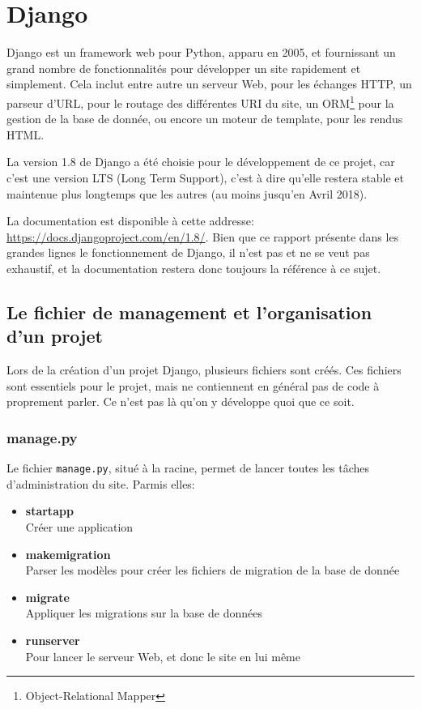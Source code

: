 \documentclass[a4paper]{report}
\begin{document}
\section{Django}
\label{sec:django}
\par Django est un framework web pour Python, apparu en 2005, et fournissant un grand nombre de fonctionnalités pour
développer un site rapidement et simplement. Cela inclut entre autre un serveur Web, pour les échanges HTTP, un parseur
d'URL, pour le routage des différentes URI du site, un ORM\footnote{Object-Relational Mapper} pour la gestion de la base
de donnée, ou encore un moteur de template, pour les rendus HTML.
\par La version 1.8 de Django a été choisie pour le développement de ce projet, car c'est une version LTS (Long Term
Support), c'est à dire qu'elle restera stable et maintenue plus longtemps que les autres (au moins jusqu'en Avril 2018).
\par La documentation est disponible à cette addresse: \url{https://docs.djangoproject.com/en/1.8/}. Bien que ce rapport
présente dans les grandes lignes le fonctionnement de Django, il n'est pas et ne se veut pas exhaustif, et la
documentation restera donc toujours la référence à ce sujet.

\subsection{Le fichier de management et l'organisation d'un projet}
\label{sub:Le fichier de management et l'organisation d'un projet}

\par Lors de la création d'un projet Django, plusieurs fichiers sont créés. Ces fichiers sont essentiels pour le projet,
mais ne contiennent en général pas de code à proprement parler. Ce n'est pas là qu'on y développe quoi que ce soit.

\subsubsection{manage.py}
\label{ssub:manage.py}

\par Le fichier \verb-manage.py-, situé à la racine, permet de lancer toutes les tâches d'administration du site. Parmis
elles:
\begin{itemize}
    \item \textbf{startapp} \\
        Créer une application
    \item \textbf{makemigration} \\
        Parser les modèles pour créer les fichiers de migration de la base de donnée
    \item \textbf{migrate} \\
        Appliquer les migrations sur la base de données
    \item \textbf{runserver} \\
        Pour lancer le serveur Web, et donc le site en lui même
\end{itemize}
\end{document}
